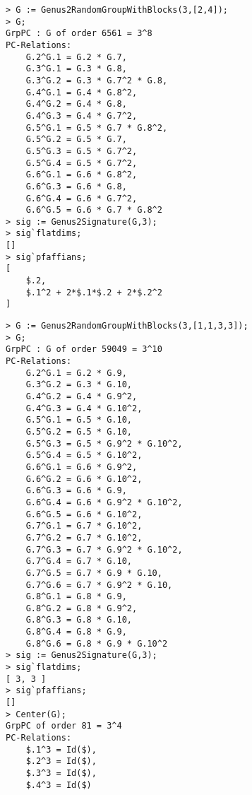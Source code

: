 \documentclass{documentation}
\begin{document}
\begin{lstlisting}[frame=single,basicstyle=\ttfamily\color{black!30!teal},backgroundcolor=\color{white!70!gray}]
> G := Genus2RandomGroupWithBlocks(3,[2,4]);  
> G;
GrpPC : G of order 6561 = 3^8
PC-Relations:
    G.2^G.1 = G.2 * G.7, 
    G.3^G.1 = G.3 * G.8, 
    G.3^G.2 = G.3 * G.7^2 * G.8, 
    G.4^G.1 = G.4 * G.8^2, 
    G.4^G.2 = G.4 * G.8, 
    G.4^G.3 = G.4 * G.7^2, 
    G.5^G.1 = G.5 * G.7 * G.8^2, 
    G.5^G.2 = G.5 * G.7, 
    G.5^G.3 = G.5 * G.7^2, 
    G.5^G.4 = G.5 * G.7^2, 
    G.6^G.1 = G.6 * G.8^2, 
    G.6^G.3 = G.6 * G.8, 
    G.6^G.4 = G.6 * G.7^2, 
    G.6^G.5 = G.6 * G.7 * G.8^2
> sig := Genus2Signature(G,3);
> sig`flatdims;
[]
> sig`pfaffians;
[
    $.2,
    $.1^2 + 2*$.1*$.2 + 2*$.2^2
]
\end{lstlisting}

\begin{lstlisting}[frame=single,basicstyle=\ttfamily\color{black!30!teal},backgroundcolor=\color{white!70!gray}]
> G := Genus2RandomGroupWithBlocks(3,[1,1,3,3]);
> G;
GrpPC : G of order 59049 = 3^10
PC-Relations:
    G.2^G.1 = G.2 * G.9, 
    G.3^G.2 = G.3 * G.10, 
    G.4^G.2 = G.4 * G.9^2, 
    G.4^G.3 = G.4 * G.10^2, 
    G.5^G.1 = G.5 * G.10, 
    G.5^G.2 = G.5 * G.10, 
    G.5^G.3 = G.5 * G.9^2 * G.10^2, 
    G.5^G.4 = G.5 * G.10^2, 
    G.6^G.1 = G.6 * G.9^2, 
    G.6^G.2 = G.6 * G.10^2, 
    G.6^G.3 = G.6 * G.9, 
    G.6^G.4 = G.6 * G.9^2 * G.10^2, 
    G.6^G.5 = G.6 * G.10^2, 
    G.7^G.1 = G.7 * G.10^2, 
    G.7^G.2 = G.7 * G.10^2, 
    G.7^G.3 = G.7 * G.9^2 * G.10^2, 
    G.7^G.4 = G.7 * G.10, 
    G.7^G.5 = G.7 * G.9 * G.10, 
    G.7^G.6 = G.7 * G.9^2 * G.10, 
    G.8^G.1 = G.8 * G.9, 
    G.8^G.2 = G.8 * G.9^2, 
    G.8^G.3 = G.8 * G.10, 
    G.8^G.4 = G.8 * G.9, 
    G.8^G.6 = G.8 * G.9 * G.10^2
> sig := Genus2Signature(G,3);
> sig`flatdims;
[ 3, 3 ]
> sig`pfaffians;
[]
> Center(G);
GrpPC of order 81 = 3^4
PC-Relations:
    $.1^3 = Id($), 
    $.2^3 = Id($), 
    $.3^3 = Id($), 
    $.4^3 = Id($)
\end{lstlisting}

\begin{bibdiv}
\begin{biblist}



\end{biblist}
\end{bibdiv}
\end{document}
